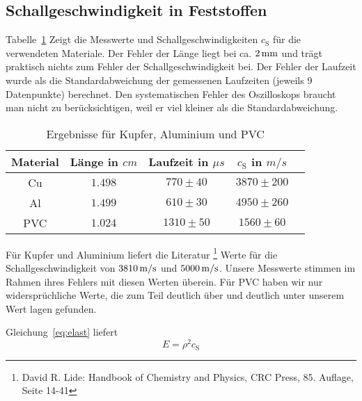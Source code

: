 \subsection{Schallgeschwindigkeit in Feststoffen}
Tabelle~\ref{tb:res} Zeigt die Messwerte und Schallgeschwindigkeiten $c_\mathrm{S}$ für die verwendeten Materiale. Der Fehler der Länge liegt bei ca. $\unit[2]{mm}$ und trägt praktisch nichts zum Fehler der Schallgeschwindigkeit bei. 
Der Fehler der Laufzeit wurde als die Standardabweichung der gemessenen Laufzeiten (jeweils 9 Datenpunkte) berechnet. Den systematischen Fehler des Oszilloskops braucht man nicht zu berücksichtigen, weil er viel kleiner als die Standardabweichung.

\begin{table}
    \centering
\begin{tabular}[h]{c c c c c }
    Material & Länge in $\unit{cm}$ & Laufzeit in $\unit{\mu s}$ & $c_\mathrm{S}$ in $\unit{m/s}$ \\\hline
    Cu & $1.498$ & $770 \pm 40$ & $3870 \pm 200$ \\
    Al & $1.499$ & $610 \pm 30$ & $4950 \pm 260$ \\
    PVC & $1.024$ & $1310 \pm 50$ & $1560 \pm 60$ \\
\end{tabular}
\caption{Ergebnisse für Kupfer, Aluminium und PVC}
\label{tb:res}
\end{table}

Für Kupfer und Aluminium liefert die Literatur%
\footnote{David R. Lide: Handbook of Chemistry and Physics, CRC Press, 85. Auflage, Seite 14-41}
Werte für die Schallgeschwindigkeit von $\unit[3810]{m/s}$ und $\unit[5000]{m/s}$. Unsere Messwerte stimmen im Rahmen ihres  Fehlers mit diesen Werten überein. Für PVC haben wir nur widersprüchliche Werte, die zum Teil deutlich über und deutlich unter unserem Wert lagen gefunden.

Gleichung~\ref{eq:elast} liefert
%
\begin{equation*}
    E = \rho^2 c_\mathrm{S}
\end{equation*}
%


